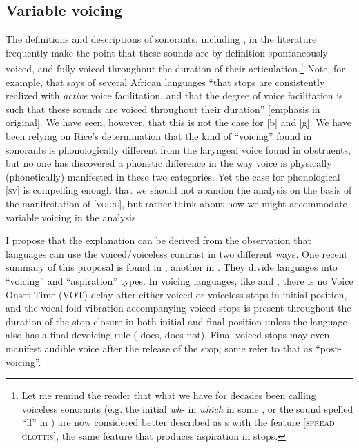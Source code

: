 \documentclass[output=paper]{LSP/langsci}
\begin{document}
\subsection{Variable voicing}

The definitions and descriptions of sonorants, including , in the literature frequently make the point that these sounds are by definition spontaneously voiced, and fully voiced throughout the duration of their articulation.\footnote{Let me remind the reader that what we have for decades been calling voiceless sonorants (e.g. the initial \textit{wh-} in  \textit{which} in some , or the sound spelled ``ll'' in ) are now considered better described as s with the feature [\textsc{spread glottis}], the same feature that produces aspiration in stops.} Note, for example, that \citet[188]{Botma2011} says of several African languages ``that  stops are consistently realized with \textit{active} voice facilitation, and that the degree of voice facilitation is such that these sounds are voiced throughout their duration'' [emphasis in original]. We have seen, however, that this is not the case for  [b] and [g]. We have been relying on Rice's determination that the kind of ``voicing'' found in sonorants is phonologically different from the laryngeal voice found in obstruents, but no one has discovered a phonetic difference in the way voice is physically (phonetically) manifested in these two categories. Yet the case for phonological [\textsc{sv}] is compelling enough that we should not abandon the analysis on the basis of the manifestation of [\textsc{voice}], but rather think about how we might accommodate variable voicing in the analysis.

I propose that the explanation can be derived from the observation that languages can use the voiced/voiceless contrast in two different ways. One recent summary of this proposal is found in \citet[15--19]{Harris2009}, another in \citet{RingenEtAl2013}. They divide languages into ``voicing'' and ``aspiration'' types. In voicing languages, like  and , there is no Voice Onset Time (VOT) delay after either voiced or voiceless stops in initial position, and the vocal fold vibration accompanying voiced stops is present throughout the duration of the stop closure in both initial and final position unless the language also has a final devoicing rule ( does,  does not). Final voiced stops may even manifest audible voice after the release of the stop; some refer to that as ``post-voicing''.
\end{document}
